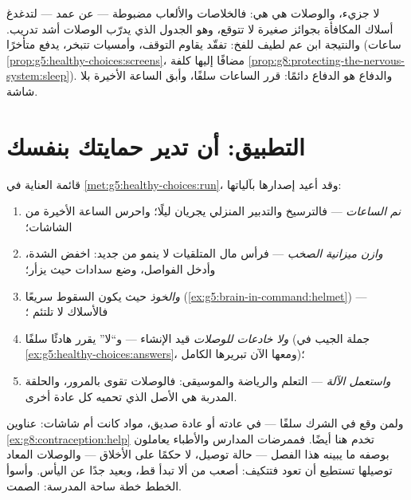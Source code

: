 \begin{example}\label{ex:g8:protecting-the-nervous-system:screens}
لا جزيء، والوصلات هي هي: فالخلاصات والألعاب مضبوطة ---
عن عمد --- لتدغدغ أسلاك المكافأة بجوائز صغيرة لا تتوقع،
وهو الجدول الذي يدرّب الوصلات أشد تدريب. والنتيجة ابن عم
لطيف للفخ: تفقّد يقاوم التوقف، وأمسيات تتبخر،  يدفع
متأخرًا (ساعات
\cref{prop:g5:healthy-choices:screens}، مضافًا إليها
كلفة
\cref{prop:g8:protecting-the-nervous-system:sleep}).
والدفاع هو الدفاع دائمًا: قرر الساعات سلفًا، وأبق الساعة
الأخيرة بلا شاشة.
\end{example}

\section{التطبيق: أن تدير حمايتك بنفسك}

\begin{method}\label{met:g8:protecting-the-nervous-system:manual}
قائمة العناية في \cref{met:g5:healthy-choices:run}، وقد
أعيد إصدارها بآلياتها:
\begin{enumerate}
  \item \emph{نم الساعات} --- فالترسيخ والتدبير المنزلي
        يجريان ليلًا؛ واحرس الساعة الأخيرة من الشاشات؛
  \item \emph{وازن ميزانية الصخب} --- فرأس مال
        المتلقيات لا ينمو من جديد: اخفض الشدة، وأدخل
        الفواصل، وضع سدادات  حيث يزأر؛
  \item \emph{والخوذ} حيث يكون السقوط سريعًا
        (\cref{ex:g5:brain-in-command:helmet}) ---
        فالأسلاك لا تلتئم ؛
  \item \emph{ولا خادعات للوصلات}  قيد الإنشاء ---
        و``لا'' يقرر هادئًا سلفًا (جملة الجيب في
        \cref{ex:g5:healthy-choices:answers}، ومعها الآن
        تبريرها الكامل)؛
  \item \emph{واستعمل الآلة} --- التعلم والرياضة
        والموسيقى: فالوصلات تقوى بالمرور، والحلقة
        المدربة هي الأصل الذي تحميه كل عادة أخرى.
\end{enumerate}
\end{method}

\begin{example}\label{ex:g8:protecting-the-nervous-system:help}
ولمن وقع في الشرك سلفًا --- في عادته أو عادة صديق، مواد
كانت أم شاشات: عناوين \cref{ex:g8:contraception:help}
تخدم هنا أيضًا. فممرضات المدارس والأطباء يعاملون 
بوصفه ما يبينه هذا الفصل --- حالة توصيل، لا حكمًا على
الأخلاق --- والوصلات المعاد توصيلها تستطيع أن تعود
فتتكيف: أصعب من ألا تبدأ قط، وبعيد جدًا عن اليأس. وأسوأ
الخطط خطة ساحة المدرسة: الصمت.
\end{example}

